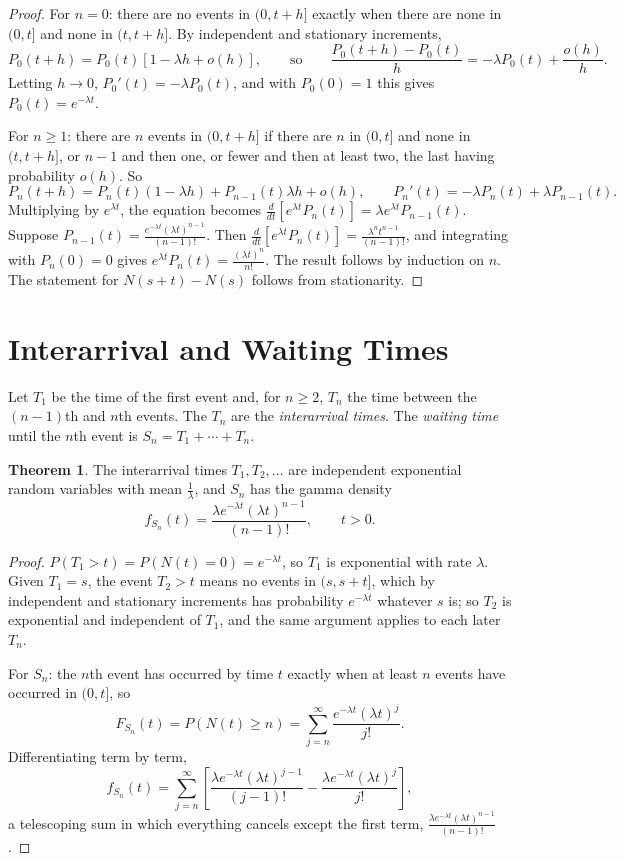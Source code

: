 \documentclass[12pt,a4paper]{report}
\theoremstyle{definition}
\newtheorem{thm}{Theorem}[section]
\begin{document}
\begin{proof}
For $n = 0$: there are no events in $(0, t + h]$ exactly when there are none in $(0, t]$ and none
in $(t, t + h]$. By independent and stationary increments,
\[P_0(t + h) = P_0(t)\left[1 - \lambda h + o(h)\right],\qquad\text{so}\qquad
\frac{P_0(t + h) - P_0(t)}{h} = -\lambda P_0(t) + \frac{o(h)}{h} .\]
Letting $h\to 0$, $P_0'(t) = -\lambda P_0(t)$, and with $P_0(0) = 1$ this gives $P_0(t) = e^{-\lambda t}$.

For $n\geq 1$: there are $n$ events in $(0, t + h]$ if there are $n$ in $(0, t]$ and none in
$(t, t + h]$, or $n - 1$ and then one, or fewer and then at least two, the last having probability
$o(h)$. So
\[P_n(t + h) = P_n(t)(1 - \lambda h) + P_{n-1}(t)\lambda h + o(h),\qquad
P_n'(t) = -\lambda P_n(t) + \lambda P_{n-1}(t) .\]
Multiplying by $e^{\lambda t}$, the equation becomes $\frac{d}{dt}\left[e^{\lambda t}P_n(t)\right] = \lambda e^{\lambda t}P_{n-1}(t)$.
Suppose $P_{n-1}(t) = \frac{e^{-\lambda t}(\lambda t)^{n-1}}{(n - 1)!}$. Then
$\frac{d}{dt}\left[e^{\lambda t}P_n(t)\right] = \frac{\lambda^nt^{n-1}}{(n - 1)!}$, and integrating with
$P_n(0) = 0$ gives $e^{\lambda t}P_n(t) = \frac{(\lambda t)^n}{n!}$. The result follows by induction on
$n$. The statement for $N(s + t) - N(s)$ follows from stationarity.
\end{proof}

\section{Interarrival and Waiting Times}

Let $T_1$ be the time of the first event and, for $n\geq 2$, $T_n$ the time between the
$(n - 1)$th and $n$th events. The $T_n$ are the \emph{interarrival times}. The \emph{waiting time}
until the $n$th event is $S_n = T_1 + \cdots + T_n$.

\begin{thm}
\label{thm:interarrival}
The interarrival times $T_1, T_2, \dots$ are independent exponential random variables with mean
$\frac1\lambda$, and $S_n$ has the gamma density
\[f_{S_n}(t) = \frac{\lambda e^{-\lambda t}(\lambda t)^{n-1}}{(n - 1)!},\qquad t>0 .\]
\end{thm}

\begin{proof}
$P(T_1>t) = P(N(t) = 0) = e^{-\lambda t}$, so $T_1$ is exponential with rate $\lambda$. Given $T_1 = s$,
the event $T_2>t$ means no events in $(s, s + t]$, which by independent and stationary
increments has probability $e^{-\lambda t}$ whatever $s$ is; so $T_2$ is exponential and independent
of $T_1$, and the same argument applies to each later $T_n$.

For $S_n$: the $n$th event has occurred by time $t$ exactly when at least $n$ events have occurred
in $(0, t]$, so
\[F_{S_n}(t) = P(N(t)\geq n) = \sum_{j=n}^\infty\frac{e^{-\lambda t}(\lambda t)^j}{j!} .\]
Differentiating term by term,
\[f_{S_n}(t) = \sum_{j=n}^\infty\left[\frac{\lambda e^{-\lambda t}(\lambda t)^{j-1}}{(j - 1)!} - \frac{\lambda e^{-\lambda t}(\lambda t)^j}{j!}\right],\]
a telescoping sum in which everything cancels except the first term, $\frac{\lambda e^{-\lambda t}(\lambda t)^{n-1}}{(n - 1)!}$.
\end{proof}
\end{document}
